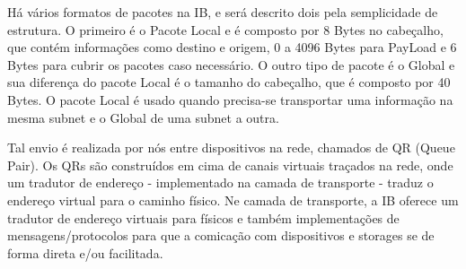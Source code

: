 \documentclass[a4paper,12pt]{article}
\begin{document}
Há vários formatos de pacotes na IB, e será descrito dois pela semplicidade de estrutura. O primeiro é o Pacote Local e é composto por 8 Bytes no cabeçalho, que contém informações como destino e origem, 0 a 4096 Bytes para PayLoad e 6 Bytes para cubrir os pacotes caso necessário. O outro tipo de pacote é o Global e sua diferença do pacote Local é o tamanho do cabeçalho, que é composto por 40 Bytes. O pacote Local é usado quando precisa-se transportar uma informação na mesma subnet e o Global de uma subnet a outra.

Tal envio é realizada por nós entre dispositivos na rede, chamados de QR (Queue Pair). Os QRs são construídos em cima de canais virtuais traçados na rede, onde um tradutor de endereço - implementado na camada de transporte - traduz o endereço virtual para o caminho físico. Ne camada de transporte, a IB oferece um tradutor de endereço virtuais para físicos e também implementações de mensagens/protocolos para que a comicação com dispositivos e storages se de forma direta e/ou facilitada.
\end{document}
